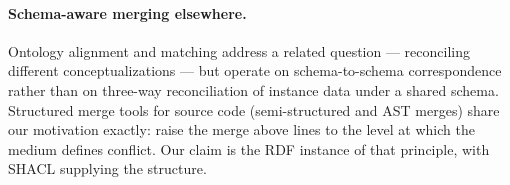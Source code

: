 \paragraph{Schema-aware merging elsewhere.} Ontology alignment and matching
address a related question --- reconciling different conceptualizations --- but
operate on schema-to-schema correspondence rather than on three-way
reconciliation of instance data under a shared schema. Structured merge tools
for source code (semi-structured and AST merges) share our motivation exactly:
raise the merge above lines to the level at which the medium defines conflict.
Our claim is the RDF instance of that principle, with SHACL supplying the
structure.
